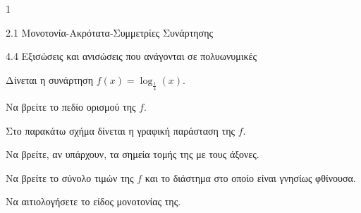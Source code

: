 \begin{ylh}{1}
\item 2.1 Μονοτονία-Ακρότατα-Συμμετρίες Συνάρτησης
\item 4.4 Εξισώσεις και ανισώσεις που ανάγονται σε πολυωνυμικές
\end{ylh}
Δίνεται η συνάρτηση $f(x) = \log_{\frac{1}{4}}(x)$.
\begin{alist}
\item Να βρείτε το πεδίο ορισμού της $f$. 
\item Στο παρακάτω σχήμα δίνεται η γραφική παράσταση της $f$. 
\begin{rlist}
\item Να βρείτε, αν υπάρχουν, τα σημεία τομής της με τους άξονες. 
\item Να βρείτε το σύνολο τιμών της $f$ και το διάστημα στο οποίο είναι γνησίως φθίνουσα. 
\end{rlist}
\begin{center}
\end{center}
\item Να αιτιολογήσετε το είδος μονοτονίας της. 
\end{alist}

